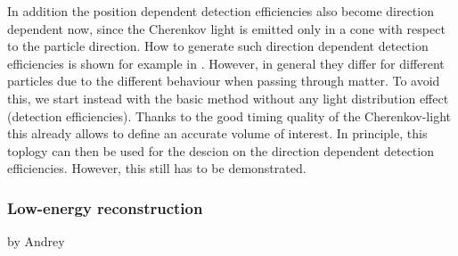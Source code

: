   In addition the position dependent detection efficiencies also become direction dependent now, since the Cherenkov 
  light is emitted only in a cone with respect to the particle direction. How to generate such direction dependent
  detection efficiencies is shown for example in \cite{patt09}. However, in general they differ for different particles
  due to the different behaviour when passing through matter. To avoid
  this, we start instead with the basic method without any light distribution effect (detection efficiencies). Thanks to 
  the good timing quality of the Cherenkov-light this already allows to define an accurate volume of interest. In principle,
  this toplogy can then be used for the descion on the direction dependent detection efficiencies. However, this still has to be demonstrated.
  
  
  

\subsubsection{Low-energy reconstruction} 

by Andrey


%
%
%
%
%
%
%
